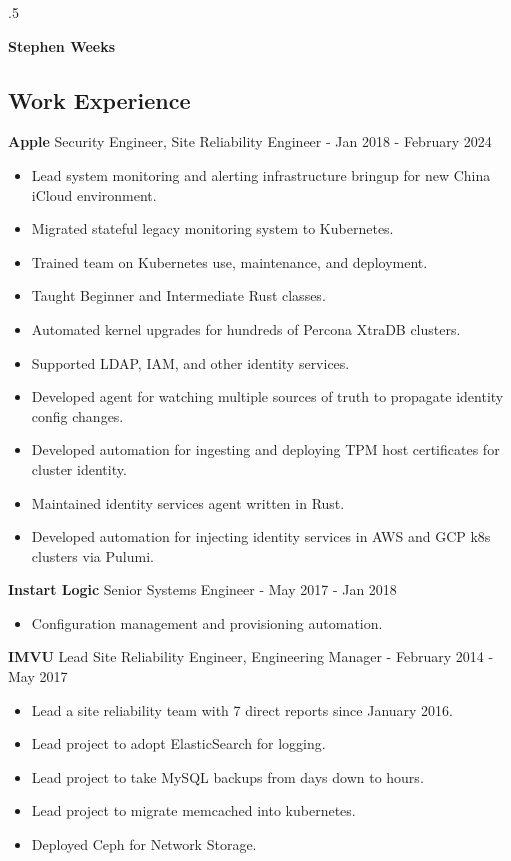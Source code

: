 \documentclass[line]{res}
\begin{document}
\moveleft.5\hoffset\centerline{\Huge\textbf{Stephen Weeks}}

\address{408.702.4448 tene@allalone.org}

\begin{resume}

\section{Work Experience}
\textbf{Apple} Security Engineer, Site Reliability Engineer - Jan 2018 - February 2024
\begin{itemize}
\item Lead system monitoring and alerting infrastructure bringup for new China iCloud environment.
\item Migrated stateful legacy monitoring system to Kubernetes.
\item Trained team on Kubernetes use, maintenance, and deployment.
\item Taught Beginner and Intermediate Rust classes.
\item Automated kernel upgrades for hundreds of Percona XtraDB clusters.
\item Supported LDAP, IAM, and other identity services.
\item Developed agent for watching multiple sources of truth to propagate identity config changes.
\item Developed automation for ingesting and deploying TPM host certificates for cluster identity.
\item Maintained identity services agent written in Rust.
\item Developed automation for injecting identity services in AWS and GCP k8s clusters via Pulumi.
\end{itemize}

\textbf{Instart Logic} Senior Systems Engineer - May 2017 - Jan 2018
\begin{itemize}
\item Configuration management and provisioning automation.
\end{itemize}

\textbf{IMVU} Lead Site Reliability Engineer, Engineering Manager - February 2014 - May 2017
\begin{itemize}
\item Lead a site reliability team with 7 direct reports since January 2016.
\item Lead project to adopt ElasticSearch for logging.
\item Lead project to take MySQL backups from days down to hours.
\item Lead project to migrate memcached into kubernetes.
\item Deployed Ceph for Network Storage.
\end{itemize}


\end{resume}
\end{document}
